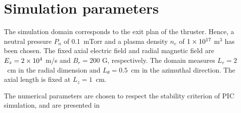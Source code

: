 
\section{Simulation parameters}
  \label{sec-params}
  
  The simulation domain corresponds to the exit plan of the thruster.
  Hence, a neutral pressure $P_n$ of 0.1~mTorr and a plasma density $n_e$ of ${1}\times 10^{17}$ m$^{3}$ has been chosen.
  The fixed axial electric field and radial magnetic field are $E_z={2}\times 10^{4}$ m/s and $B_r=200$ G, respectively.
  The domain measures $L_r=2$~cm in the radial dimension and $L_{\theta}=0.5$~cm in the azimuthal direction.
  The axial length is fixed at $L_z=1$~cm.
  
  The numerical parameters are chosen to respect the stability criterion of \ac{PIC} simulation, and are presented in 
  
